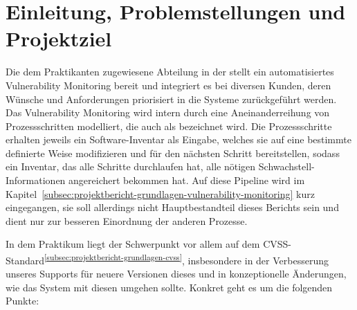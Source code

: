 \section{Einleitung, Problemstellungen und Projektziel} \label{sec:projektbericht-projektziel}

Die dem Praktikanten zugewiesene Abteilung in der {\metaeffekt} stellt ein automatisiertes Vulnerability Monitoring bereit und integriert es bei diversen Kunden, deren Wünsche und Anforderungen priorisiert in die Systeme zurückgeführt werden.
Das Vulnerability Monitoring wird intern durch eine Aneinanderreihung von Prozessschritten modelliert, die auch als  bezeichnet wird.
Die Prozessschritte erhalten jeweils ein Software-Inventar als Eingabe, welches sie auf eine bestimmte definierte Weise modifizieren und für den nächsten Schritt bereitstellen, sodass ein Inventar, das alle Schritte durchlaufen hat, alle nötigen Schwachstell-Informationen angereichert bekommen hat.
Auf diese Pipeline wird im Kapitel\ \ref{subsec:projektbericht-grundlagen-vulnerability-monitoring} kurz eingegangen, sie soll allerdings nicht Hauptbestandteil dieses Berichts sein und dient nur zur besseren Einordnung der anderen Prozesse.

In dem Praktikum liegt der Schwerpunkt vor allem auf dem CVSS-Standard\textsuperscript{\ref{subsec:projektbericht-grundlagen-cvss}}, insbesondere in der Verbesserung unseres Supports für neuere Versionen dieses und in konzeptionelle Änderungen, wie das System mit diesen umgehen sollte.
Konkret geht es um die folgenden Punkte:

